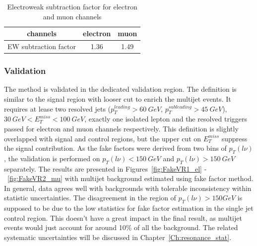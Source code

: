 \begin{table}[h]
  \caption{Electroweak subtraction factor for electron and muon channels} \label{tab:ewsubtraction}
  \begin{center}

    \begin{tabular}{ | c | c | c | }
     \hline
     channels                       &   electron   & muon \\ \hline
     EW subtraction factor          &   1.36       & 1.49 \\ \hline
\end{tabular}
\end{center}
\end{table}

\subsubsection*{Validation}
The method is validated in the dedicated validation region. The definition is similar to the signal region with looser cut to enrich the multijet events. It requires at lease two resolved jets ($p_{T}^{leading}>60~GeV$, $p_{T}^{subleading}>45~GeV$), $30~GeV<E^{miss}_{T}<100~GeV$, exactly one isolated lepton and the resolved triggers passed for electron and muon channels respectively. This definition is slightly overlapped with signal and control regions, but the upper cut on $E^{miss}_{T}$ suppress the signal contribution.  As the fake factors were derived from two bins of $p_{T}(l\nu)$, the validation is performed on $p_{T}(l\nu)<150~GeV$ and $p_{T}(l\nu)>150~GeV$ separately. The results are presented in Figures~\ref{fig:FakeVR1_el} -~\ref{fig:FakeVR2_mu} with multijet background estimated using fake factor method. In general, data agrees well with backgrounds with tolerable inconsistency within statistic uncertainties. The disagreement in the region of $p_{T}(l\nu)>150 GeV$ is supposed to be due to the low statistics for fake factor estimation in the single jet control region. This doesn't have a great impact in the final result, as multijet events would just account for around 10\% of all the background. The related systematic uncertainties will be discussed in Chapter~\ref{Ch:resonance_stat}.
